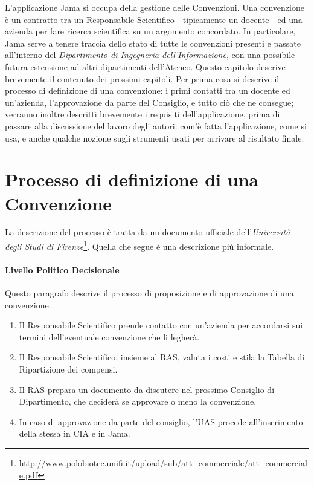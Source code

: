 L'applicazione Jama si occupa della gestione delle Convenzioni. Una convenzione è un contratto tra un Responsabile Scientifico - tipicamente un docente - ed una azienda per fare ricerca scientifica su un argomento concordato. In particolare, Jama serve a tenere traccia dello stato di tutte le convenzioni presenti e passate all'interno del \textsl{Dipartimento di Ingegneria dell'Informazione}, con una possibile futura estensione ad altri dipartimenti dell'Ateneo.\newline
Questo capitolo descrive brevemente il contenuto dei prossimi capitoli.\newline
Per prima cosa si descrive il processo di definizione di una convenzione: i primi contatti tra un docente ed un'azienda, l'approvazione da parte del Consiglio, e tutto ciò che ne consegue; verranno inoltre descritti brevemente i requisiti dell'applicazione, prima di passare alla discussione del lavoro degli autori: com'è fatta l'applicazione, come si usa, e anche qualche nozione sugli strumenti usati per arrivare al risultato finale.

\section{Processo di definizione di una Convenzione}
La descrizione del processo è tratta da un documento ufficiale dell'\textsl{Università degli Studi di Firenze}\footnote{\url{http://www.polobiotec.unifi.it/upload/sub/att_commerciale/att_commerciale.pdf}}. Quella che segue è una descrizione più informale.

\paragraph{Livello Politico Decisionale}
Questo paragrafo descrive il processo di proposizione e di approvazione di una convenzione.\newline

\begin{enumerate}
\item Il Responsabile Scientifico prende contatto con un'azienda per accordarsi sui termini dell'eventuale convenzione che li legherà.
\item
Il Responsabile Scientifico, insieme al RAS, valuta i costi e stila la Tabella di Ripartizione dei compensi.
\item Il RAS prepara un documento da discutere nel prossimo Consiglio di Dipartimento, che deciderà se approvare o meno la convenzione.
\item In caso di approvazione da parte del consiglio, l'UAS procede all'inserimento della stessa in CIA e in Jama.
\end{enumerate}

